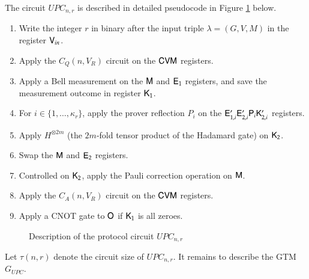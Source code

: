 The circuit $UPC_{n,r}$ is described in detailed pseudocode in Figure \ref{fig:upc} below.

\begin{center}
\begin{mdframed}
	\begin{enumerate}
		\item Write the integer $r$ in binary after the input triple $\lambda = (G,V,M)$ in the register ${\mathsf{V}}_{in}$.
		\item Apply the $C_Q(n,V_R)$ circuit on the ${\mathsf{C}} {\mathsf{V}} {\mathsf{M}}$ registers.
    \item Apply a Bell measurement on the ${\mathsf{M}}$ and ${\mathsf{E}}_1$ registers, and save the measurement outcome in register ${\mathsf{K}}_1$.
    \item For $i \in \{1,\ldots,\kappa_r\}$, apply the prover reflection $P_i$ on the ${\mathsf{E}}_{1,i}' {\mathsf{E}}_{2,i}' {\mathsf{P}}_i {\mathsf{K}}_{2,i}'$ registers.
    \item Apply $H^{\otimes 2m}$ (the $2m$-fold tensor product of the Hadamard gate) on ${\mathsf{K}}_2$. 
    \item Swap the ${\mathsf{M}}$ and ${\mathsf{E}}_2$ registers.
    \item Controlled on ${\mathsf{K}}_2$, apply the Pauli correction operation on ${\mathsf{M}}$.
    \item Apply the $C_A(n,V_R)$ circuit on the ${\mathsf{C}} {\mathsf{V}} {\mathsf{M}}$ registers.
    \item Apply a CNOT gate to ${\mathsf{O}}$ if ${\mathsf{K}}_1$ is all zeroes.
    \end{enumerate}
\end{mdframed}
\begin{figure}[H]
\caption{Description of the protocol circuit \textsc{$UPC_{n,r}$}}
\label{fig:upc}
\end{figure}
\end{center}







Let $\tau(n,r)$ denote the circuit size of $UPC_{n,r}$. It remains to describe the GTM $G_{UPC}$. 

